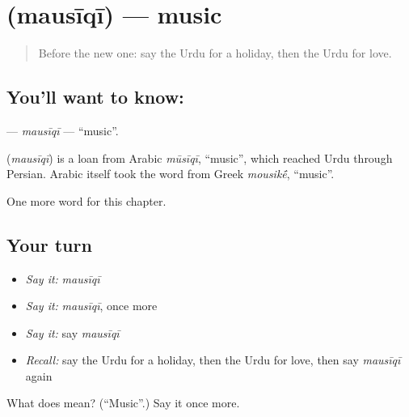 \section[\texorpdfstring{\ur{موسیقی} (mausīqī)}{موسیقی (mausīqī)}]{ (mausīqī) — music}

\label{lesson:UR-C87-mausiqi}



\begin{quote}
Before the new one: say the Urdu for a holiday, then the Urdu for love.
\end{quote}

\subsection*{You'll want to know: }
\textbf{} — \emph{mausīqī} — \textquotedblleft{}music\textquotedblright{}.

\begin{cousinweb}
\textbf{} (\emph{mausīqī}) is a loan from Arabic \emph{mūsīqī}, \textquotedblleft{}music\textquotedblright{}, which reached Urdu through Persian. Arabic itself took the word from Greek \emph{mousik\'{\={e}}}, \textquotedblleft{}music\textquotedblright{}.
\end{cousinweb}

\begin{grammarlens}[title={What you've built}]
One more word for this chapter.
\end{grammarlens}

\subsection*{Your turn}
\begin{itemize}
\raggedright
  \item \emph{Say it:} \emph{mausīqī}
  \item \emph{Say it:} \emph{mausīqī}, once more
  \item \emph{Say it:} say \emph{mausīqī}
  \item \emph{Recall:} say the Urdu for a holiday, then the Urdu for love, then say \emph{mausīqī} again
\end{itemize}

\begin{tcolorbox}[breakable,colback=teal!4,colframe=teal!35!black,title={Before you move on}]
What does  mean? (\textquotedblleft{}Music\textquotedblright{}.) Say it once more.
\end{tcolorbox}
